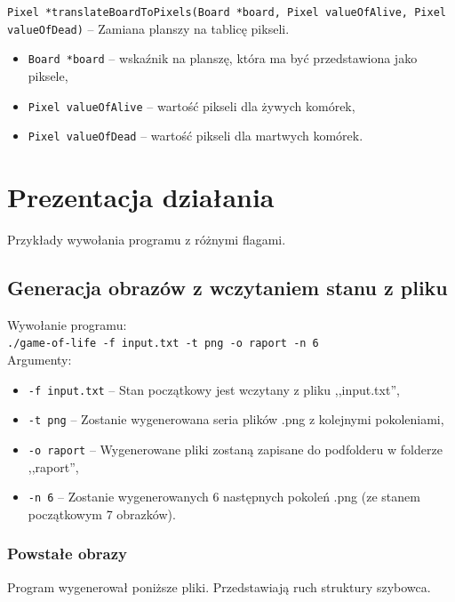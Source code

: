 \documentclass{mwart}
\begin{document}
\noindent{}\texttt{Pixel *translateBoardToPixels(Board *board, Pixel valueOfAlive, Pixel valueOfDead)} -- Zamiana planszy na tablicę pikseli.
\begin{itemize}[label={}]
	\item\texttt{Board *board} -- wskaźnik na planszę, która ma być przedstawiona jako piksele,
	\item\texttt{Pixel valueOfAlive} -- wartość pikseli dla żywych komórek,
	\item \texttt{Pixel valueOfDead} -- wartość pikseli dla martwych komórek.
\end{itemize}

\section{Prezentacja działania}
Przykłady wywołania programu z różnymi flagami.

\subsection{Generacja obrazów z wczytaniem stanu z pliku}
\noindent{}Wywołanie programu: \\
\texttt{./game-of-life -f input.txt -t png -o raport -n 6} \\
Argumenty:
\begin{itemize}
\item \texttt{-f input.txt} -- Stan początkowy jest wczytany z pliku ,,input.txt'',
\item \texttt{-t png} -- Zostanie wygenerowana seria plików .png z kolejnymi pokoleniami,
\item \texttt{-o raport} -- Wygenerowane pliki zostaną zapisane do podfolderu w folderze ,,raport'',
\item \texttt{-n 6} -- Zostanie wygenerowanych 6 następnych pokoleń .png (ze stanem początkowym 7 obrazków).
\end{itemize}

\subsubsection*{Powstałe obrazy}
Program wygenerował poniższe pliki. Przedstawiają ruch struktury szybowca.
\end{document}

